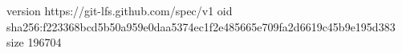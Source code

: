 version https://git-lfs.github.com/spec/v1
oid sha256:f223368bcd5b50a959e0daa5374ec1f2e485665e709fa2d6619c45b9e195d383
size 196704
